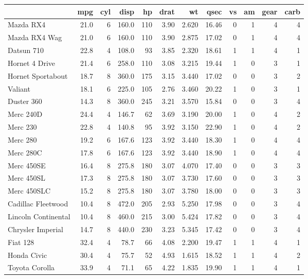 \documentclass[
]{book}
\theoremstyle{definition}
\theoremstyle{definition}
\theoremstyle{definition}
\theoremstyle{definition}
\theoremstyle{remark}
\begin{document}
\begin{tabular}{l|r|r|r|r|r|r|r|r|r|r|r}
\hline
  & mpg & cyl & disp & hp & drat & wt & qsec & vs & am & gear & carb\\
\hline
Mazda RX4 & 21.0 & 6 & 160.0 & 110 & 3.90 & 2.620 & 16.46 & 0 & 1 & 4 & 4\\
\hline
Mazda RX4 Wag & 21.0 & 6 & 160.0 & 110 & 3.90 & 2.875 & 17.02 & 0 & 1 & 4 & 4\\
\hline
Datsun 710 & 22.8 & 4 & 108.0 & 93 & 3.85 & 2.320 & 18.61 & 1 & 1 & 4 & 1\\
\hline
Hornet 4 Drive & 21.4 & 6 & 258.0 & 110 & 3.08 & 3.215 & 19.44 & 1 & 0 & 3 & 1\\
\hline
Hornet Sportabout & 18.7 & 8 & 360.0 & 175 & 3.15 & 3.440 & 17.02 & 0 & 0 & 3 & 2\\
\hline
Valiant & 18.1 & 6 & 225.0 & 105 & 2.76 & 3.460 & 20.22 & 1 & 0 & 3 & 1\\
\hline
Duster 360 & 14.3 & 8 & 360.0 & 245 & 3.21 & 3.570 & 15.84 & 0 & 0 & 3 & 4\\
\hline
Merc 240D & 24.4 & 4 & 146.7 & 62 & 3.69 & 3.190 & 20.00 & 1 & 0 & 4 & 2\\
\hline
Merc 230 & 22.8 & 4 & 140.8 & 95 & 3.92 & 3.150 & 22.90 & 1 & 0 & 4 & 2\\
\hline
Merc 280 & 19.2 & 6 & 167.6 & 123 & 3.92 & 3.440 & 18.30 & 1 & 0 & 4 & 4\\
\hline
Merc 280C & 17.8 & 6 & 167.6 & 123 & 3.92 & 3.440 & 18.90 & 1 & 0 & 4 & 4\\
\hline
Merc 450SE & 16.4 & 8 & 275.8 & 180 & 3.07 & 4.070 & 17.40 & 0 & 0 & 3 & 3\\
\hline
Merc 450SL & 17.3 & 8 & 275.8 & 180 & 3.07 & 3.730 & 17.60 & 0 & 0 & 3 & 3\\
\hline
Merc 450SLC & 15.2 & 8 & 275.8 & 180 & 3.07 & 3.780 & 18.00 & 0 & 0 & 3 & 3\\
\hline
Cadillac Fleetwood & 10.4 & 8 & 472.0 & 205 & 2.93 & 5.250 & 17.98 & 0 & 0 & 3 & 4\\
\hline
Lincoln Continental & 10.4 & 8 & 460.0 & 215 & 3.00 & 5.424 & 17.82 & 0 & 0 & 3 & 4\\
\hline
Chrysler Imperial & 14.7 & 8 & 440.0 & 230 & 3.23 & 5.345 & 17.42 & 0 & 0 & 3 & 4\\
\hline
Fiat 128 & 32.4 & 4 & 78.7 & 66 & 4.08 & 2.200 & 19.47 & 1 & 1 & 4 & 1\\
\hline
Honda Civic & 30.4 & 4 & 75.7 & 52 & 4.93 & 1.615 & 18.52 & 1 & 1 & 4 & 2\\
\hline
Toyota Corolla & 33.9 & 4 & 71.1 & 65 & 4.22 & 1.835 & 19.90 & 1 & 1 & 4 & 1\\

\end{tabular}
\end{document}
